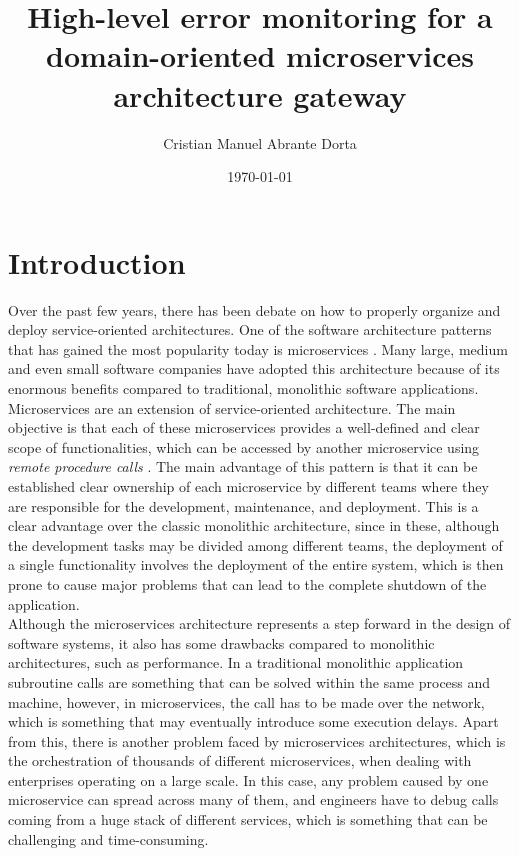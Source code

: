 \documentclass[12pt]{article}
\title{High-level error monitoring for a domain-oriented microservices architecture gateway}
\author{Cristian Manuel Abrante Dorta}
\date{\today}
\begin{document}
\maketitle

\section{Introduction}

Over the past few years, there has been debate on how to properly organize and deploy service-oriented architectures. One of the software architecture patterns that has gained the most popularity today is microservices \cite{MicroservicesAdoption}. Many large, medium and even small software companies have adopted this architecture because of its enormous benefits compared to traditional, monolithic software applications.\\

Microservices are an extension of service-oriented architecture. The main objective is that each of these microservices provides a well-defined and clear scope of functionalities, which can be accessed by another microservice using \textit{remote procedure calls} \cite{nelson1981remote}. The main advantage of this pattern is that it can be established clear ownership of each microservice by different teams where they are responsible for the development, maintenance, and deployment. This is a clear advantage over the classic monolithic architecture, since in these, although the development tasks may be divided among different teams, the deployment of a single functionality involves the deployment of the entire system, which is then prone to cause major problems that can lead to the complete shutdown of the application.\\

Although the microservices architecture represents a step forward in the design of software systems, it also has some drawbacks compared to monolithic architectures, such as performance. In a traditional monolithic application subroutine calls are something that can be solved within the same process and machine, however, in microservices, the call has to be made over the network, which is something that may eventually introduce some execution delays. Apart from this, there is another problem faced by microservices architectures, which is the orchestration of thousands of different microservices, when dealing with enterprises operating on a large scale. In this case, any problem caused by one microservice can spread across many of them, and engineers have to debug calls coming from a huge stack of different services, which is something that can be challenging and time-consuming.\\
\end{document}

